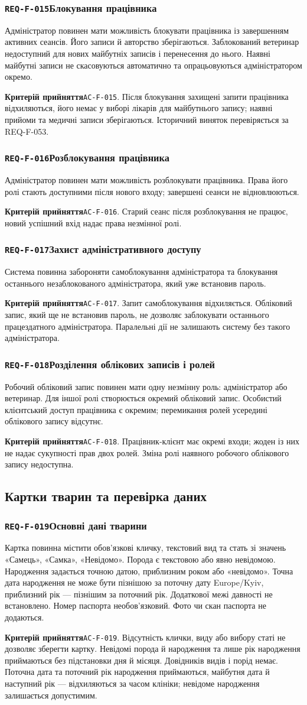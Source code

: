 \documentclass[11pt,a4paper]{article}
\newcommand{\requirement}[4]{%
  \Needspace{7\baselineskip}%
  \subsubsection*{\hypertarget{#1}{\texttt{#1}}\quad #2}%
  #3\par
  \textbf{Критерій прийняття}\quad #4\par\medskip}
\begin{document}
\requirement{REQ-F-015}{Блокування працівника}{Адміністратор повинен мати можливість блокувати працівника із завершенням активних сеансів. Його записи й авторство зберігаються. Заблокований ветеринар недоступний для нових майбутніх записів і перенесення до нього. Наявні майбутні записи не скасовуються автоматично та опрацьовуються адміністратором окремо.}{\hypertarget{AC-F-015}{\texttt{AC-F-015}}. Після блокування захищені запити працівника відхиляються, його немає у виборі лікарів для майбутнього запису; наявні прийоми та медичні записи зберігаються. Історичний виняток перевіряється за REQ-F-053.}

\requirement{REQ-F-016}{Розблокування працівника}{Адміністратор повинен мати можливість розблокувати працівника. Права його ролі стають доступними після нового входу; завершені сеанси не відновлюються.}{\hypertarget{AC-F-016}{\texttt{AC-F-016}}. Старий сеанс після розблокування не працює, новий успішний вхід надає права незмінної ролі.}

\requirement{REQ-F-017}{Захист адміністративного доступу}{Система повинна забороняти самоблокування адміністратора та блокування останнього незаблокованого адміністратора, який уже встановив пароль.}{\hypertarget{AC-F-017}{\texttt{AC-F-017}}. Запит самоблокування відхиляється. Обліковий запис, який ще не встановив пароль, не дозволяє заблокувати останнього працездатного адміністратора. Паралельні дії не залишають систему без такого адміністратора.}

\requirement{REQ-F-018}{Розділення облікових записів і ролей}{Робочий обліковий запис повинен мати одну незмінну роль: адміністратор або ветеринар. Для іншої ролі створюється окремий обліковий запис. Особистий клієнтський доступ працівника є окремим; перемикання ролей усередині облікового запису відсутнє.}{\hypertarget{AC-F-018}{\texttt{AC-F-018}}. Працівник-клієнт має окремі входи; жоден із них не надає сукупності прав двох ролей. Зміна ролі наявного робочого облікового запису недоступна.}

\subsection{Картки тварин та перевірка даних}
\requirement{REQ-F-019}{Основні дані тварини}{Картка повинна містити обов’язкові кличку, текстовий вид та стать зі значень «Самець», «Самка», «Невідомо». Порода є текстовою або явно невідомою. Народження задається точною датою, приблизним роком або «невідомо». Точна дата народження не може бути пізнішою за поточну дату Europe/Kyiv, приблизний рік — пізнішим за поточний рік. Додаткової межі давності не встановлено. Номер паспорта необов’язковий. Фото чи скан паспорта не додаються.}{\hypertarget{AC-F-019}{\texttt{AC-F-019}}. Відсутність клички, виду або вибору статі не дозволяє зберегти картку. Невідомі порода й народження та лише рік народження приймаються без підстановки дня й місяця. Довідників видів і порід немає. Поточна дата та поточний рік народження приймаються, майбутня дата й наступний рік — відхиляються за часом клініки; невідоме народження залишається допустимим.}
\end{document}
